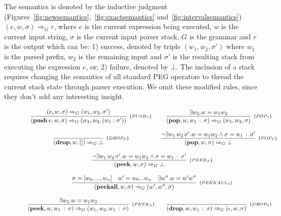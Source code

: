 \documentclass[preprint,12pt]{elsarticle}
\theoremstyle{definition}
\begin{document}
The semantics is denoted by the inductive judgment
(Figures~\ref{fig:newsemantics},~\ref{fig:exactsemantics} and~\ref{fig:intervalsemantics})
$(e, w, \sigma) \Rightarrow_G r$,
where $e$ is the current expression being executed, $w$ is the current input string,
$\sigma$ is the current input parser stack, $G$ is the grammar and $r$ is the output
which can be: 1) success, denoted by triple $(w_1,w_2,\sigma')$ where $w_1$
is the parsed prefix, $w_2$ is the remaining input and $\sigma'$ is the resulting
stack from executing the expression $e$, or; 2) failure, denoted by $\bot$.
The inclusion of a stack requires changing the semantics of all standard PEG
operators to thread the current stack state through parser execution.
We omit these modified rules, since they don't add any interesting insight.
\begin{figure}[h!]
  \[
    \begin{array}{cc}
      \infer[_{\{PUSH_S\}}]
             {(\mathbf{push}\:e,w,\sigma) \Rightarrow_G (w_1, w_2, (w_1:\sigma'))}
             {(e,w,\sigma)\Rightarrow_G (w_1,w_2,\sigma')} &
      \infer[_{\{POP_S\}}]
            {(\mathbf{pop},w,w_1\,:\,\sigma)\Rightarrow_G (w_1,w_2,\sigma)}
            {\exists w_2. w = w_1w_2} \\ \\
        \infer[_{\{DROP_F\}}]
              {(\mathbf{drop},w,[])\Rightarrow_G \bot}{} &
      \infer[_{\{POP_F\}}]
            {(\mathbf{pop},w,\sigma)\Rightarrow_G \bot}
            {\neg \exists w_1\,w_2\, \sigma'. w = w_1w_2 \land \sigma = w_1\,:\,\sigma'}\\ \\
      \multicolumn{2}{c}{
        \infer[_{\{PEEK_F\}}]
              {(\mathbf{peek},w,\sigma)\Rightarrow_G \bot}
              {\neg \exists w_1\,w_2\, \sigma'. w = w_1w_2 \land \sigma = w_1\,:\,\sigma'}
      }\\\\
      \multicolumn{2}{c}{
        \infer[_{\{PEEKALL_S\}}]
              {(\mathbf{peekall},w,\sigma)\Rightarrow_G (w', w'',\sigma)}
              {\sigma = [w_0, ..., w_n] & w' = w_0...w_n & \exists w'' . w = w'w''}
      }\\ \\
      \infer[_{\{PEEK_S\}}]
              {(\mathbf{peek},w,w_1\,:\,\sigma)\Rightarrow_G (w_1,w_2,w_1 \,:\,\sigma)}
              {\exists w_2. w = w_1w_2} &
      \infer[_{\{DROP_S\}}]
            {(\mathbf{drop},w,w_1\,:\,\sigma)\Rightarrow_G (\epsilon,w,\sigma)}
            {}\\ \\

\end{array}\]
\end{figure}
\end{document}
